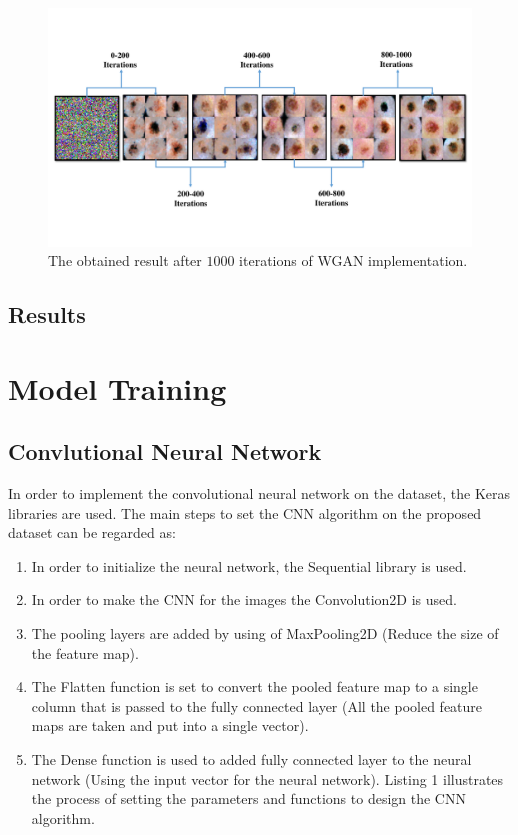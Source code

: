\documentclass[conference]{IEEEtran}
\begin{document}
\begin{figure}
\centering
\includegraphics[width=1\columnwidth]{iteration.pdf}
\caption{The obtained result after $1000$ iterations of WGAN implementation.}
\label{itere}
\end{figure}


\subsection{Results}


\section{Model Training}


\subsection{Convlutional Neural Network}
In order to implement the convolutional neural network on the dataset, the
Keras libraries are used. The main steps to set the CNN algorithm on the
proposed dataset can be regarded as:
\begin{enumerate}
\item In order to initialize the neural network, the Sequential library is used.
\item In order to make the CNN for the images the Convolution2D is used.
\item The pooling layers are added by using of MaxPooling2D (Reduce the size
of the feature map).
\item The Flatten function is set to convert the pooled feature map to a single
column that is passed to the fully connected layer (All the pooled feature
maps are taken and put into a single vector).
\item The Dense function is used to added fully connected layer to the neural network (Using the input vector for the neural network).
Listing 1 illustrates the process of setting the parameters and functions to design the CNN algorithm.
\end{enumerate}
\end{document}
